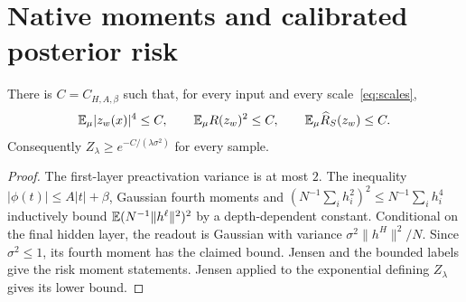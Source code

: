 \section{Native moments and calibrated posterior risk}
\begin{lemma}
\label{lem:moments}
There is $C=C_{H,A,\beta}$ such that, for every input and every scale~\eqref{eq:scales},
\[
 \mathbb E_\mu |z_w(x)|^4\le C,\qquad
 \mathbb E_\mu R(z_w)^2\le C,\qquad
 \mathbb E_\mu\widehat R_S(z_w)\le C.
\]
Consequently $Z_\lambda\ge e^{-C/(\lambda\sigma^2)}$ for every sample.
\end{lemma}
\begin{proof}
The first-layer preactivation variance is at most $2$. The inequality
$|\phi(t)|\le A|t|+\beta$, Gaussian fourth moments and
$(N^{-1}\sum_i h_i^2)^2\le N^{-1}\sum_i h_i^4$ inductively bound
$\mathbb E(N^{-1}\|h^\ell\|^2)^2$ by a depth-dependent constant. Conditional on the final hidden layer, the readout is Gaussian with variance
$\sigma^2\|h^H\|^2/N$. Since $\sigma^2\le1$, its fourth moment has the claimed bound. Jensen and the bounded labels give the risk moment statements. Jensen applied to the exponential defining $Z_\lambda$ gives its lower bound.
\end{proof}

